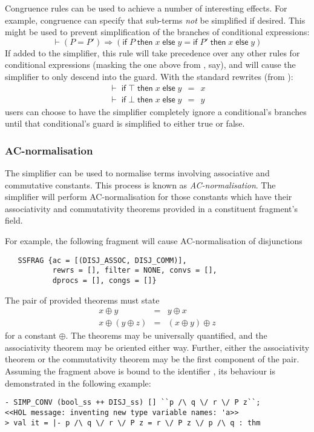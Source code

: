 Congruence rules can be used to achieve a number of interesting
effects.  For example, congruence can specify that sub-terms
\emph{not} be simplified if desired.  This might be used to prevent
simplification of the branches of conditional expressions:
\[
\vdash (P = P') \Rightarrow
       (\textsf{if}\;P\;\textsf{then}\;x\;\textsf{else}\;y =
       \textsf{if}\;P'\;\textsf{then}\;x\;\textsf{else}\;y)
\]
If added to the simplifier, this rule will take precedence over any
other rules for conditional expressions (masking the one above from
, say), and will cause the simplifier to only descend
into the guard.  With the standard rewrites (from ):
\[
\begin{array}{l}
\vdash \;\textsf{if}\;\top\;\textsf{then}\;x\;\textsf{else}\;y \,\;=\,\; x\\
\vdash \;\textsf{if}\;\bot\;\textsf{then}\;x\;\textsf{else}\;y \,\;=\,\; y
\end{array}
\]
users can choose to have the simplifier completely ignore
a conditional's branches until that conditional's guard is simplified
to either true or false.


\subsubsection{AC-normalisation}

The simplifier can be used to normalise terms involving associative
and commutative constants.  This process is known as
\emph{AC-normalisation}.  The simplifier will perform AC-normalisation
for those constants which have their associativity and commutativity
theorems provided in a constituent \simpset{} fragment's 
field.

For example, the following \simpset{} fragment will cause
AC-normalisation of disjunctions
\begin{hol}
\begin{verbatim}
   SSFRAG {ac = [(DISJ_ASSOC, DISJ_COMM)],
           rewrs = [], filter = NONE, convs = [],
           dprocs = [], congs = []}
\end{verbatim}
\end{hol}
The pair of provided theorems must state
\begin{eqnarray*}
x \oplus y &=& y \oplus x\\
x \oplus (y \oplus z) &=& (x \oplus y) \oplus z
\end{eqnarray*}
for a constant $\oplus$.  The theorems may be universally quantified,
and the associativity theorem may be oriented either way.  Further,
either the associativity theorem or the commutativity theorem may be
the first component of the pair.  Assuming the \simpset{} fragment
above is bound to the \ML{} identifier , its behaviour is
demonstrated in the following example:
\begin{session}
\begin{verbatim}
- SIMP_CONV (bool_ss ++ DISJ_ss) [] ``p /\ q \/ r \/ P z``;
<<HOL message: inventing new type variable names: 'a>>
> val it = |- p /\ q \/ r \/ P z = r \/ P z \/ p /\ q : thm
\end{verbatim}
\end{session}

